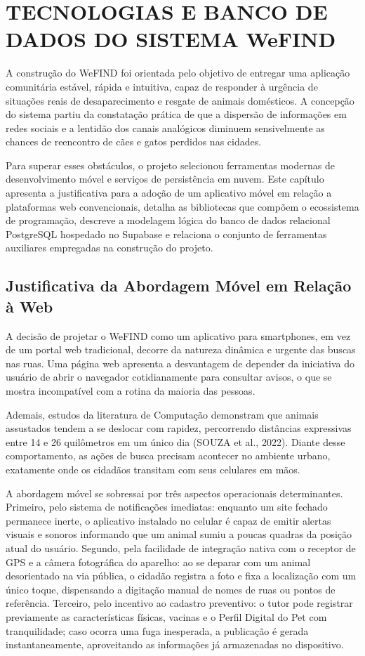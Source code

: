 \section{TECNOLOGIAS E BANCO DE DADOS DO SISTEMA WeFIND}

A construção do WeFIND foi orientada pelo objetivo de entregar uma aplicação comunitária estável, rápida e intuitiva, capaz de responder à urgência de situações reais de desaparecimento e resgate de animais domésticos. A concepção do sistema partiu da constatação prática de que a dispersão de informações em redes sociais e a lentidão dos canais analógicos diminuem sensivelmente as chances de reencontro de cães e gatos perdidos nas cidades.

Para superar esses obstáculos, o projeto selecionou ferramentas modernas de desenvolvimento móvel e serviços de persistência em nuvem. Este capítulo apresenta a justificativa para a adoção de um aplicativo móvel em relação a plataformas web convencionais, detalha as bibliotecas que compõem o ecossistema de programação, descreve a modelagem lógica do banco de dados relacional PostgreSQL hospedado no Supabase e relaciona o conjunto de ferramentas auxiliares empregadas na construção do projeto.

\subsection{Justificativa da Abordagem Móvel em Relação à Web}

A decisão de projetar o WeFIND como um aplicativo para smartphones, em vez de um portal web tradicional, decorre da natureza dinâmica e urgente das buscas nas ruas. Uma página web apresenta a desvantagem de depender da iniciativa do usuário de abrir o navegador cotidianamente para consultar avisos, o que se mostra incompatível com a rotina da maioria das pessoas.

Ademais, estudos da literatura de Computação demonstram que animais assustados tendem a se deslocar com rapidez, percorrendo distâncias expressivas entre 14 e 26 quilômetros em um único dia (SOUZA et al., 2022). Diante desse comportamento, as ações de busca precisam acontecer no ambiente urbano, exatamente onde os cidadãos transitam com seus celulares em mãos.

A abordagem móvel se sobressai por três aspectos operacionais determinantes. Primeiro, pelo sistema de notificações imediatas: enquanto um site fechado permanece inerte, o aplicativo instalado no celular é capaz de emitir alertas visuais e sonoros informando que um animal sumiu a poucas quadras da posição atual do usuário. Segundo, pela facilidade de integração nativa com o receptor de GPS e a câmera fotográfica do aparelho: ao se deparar com um animal desorientado na via pública, o cidadão registra a foto e fixa a localização com um único toque, dispensando a digitação manual de nomes de ruas ou pontos de referência. Terceiro, pelo incentivo ao cadastro preventivo: o tutor pode registrar previamente as características físicas, vacinas e o Perfil Digital do Pet com tranquilidade; caso ocorra uma fuga inesperada, a publicação é gerada instantaneamente, aproveitando as informações já armazenadas no dispositivo.

